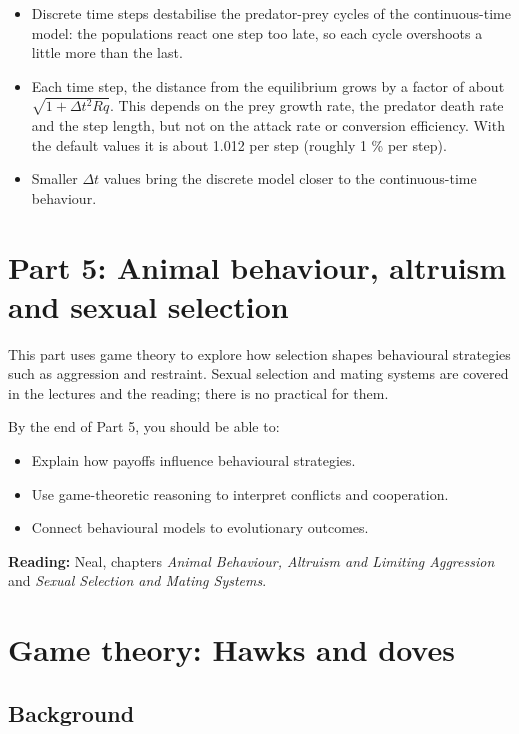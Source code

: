 \documentclass[
  a4paper]{book}
\providecommand{\tightlist}{%
  \setlength{\itemsep}{0pt}\setlength{\parskip}{0pt}}
\begin{document}
\begin{itemize}
\tightlist
\item
  Discrete time steps destabilise the predator-prey cycles of the continuous-time model: the populations react one step too late, so each cycle overshoots a little more than the last.
\item
  Each time step, the distance from the equilibrium grows by a factor of about \(\sqrt{1 + \Delta t^2 R q}\). This depends on the prey growth rate, the predator death rate and the step length, but not on the attack rate or conversion efficiency. With the default values it is about 1.012 per step (roughly 1 \% per step).
\item
  Smaller \(\Delta t\) values bring the discrete model closer to the continuous-time behaviour.
\end{itemize}

\chapter*{Part 5: Animal behaviour, altruism and sexual selection}\label{part-5}

This part uses game theory to explore how selection shapes behavioural strategies such as aggression and restraint. Sexual selection and mating systems are covered in the lectures and the reading; there is no practical for them.

By the end of Part 5, you should be able to:

\begin{itemize}
\tightlist
\item
  Explain how payoffs influence behavioural strategies.
\item
  Use game-theoretic reasoning to interpret conflicts and cooperation.
\item
  Connect behavioural models to evolutionary outcomes.
\end{itemize}

\textbf{Reading:} Neal, chapters \emph{Animal Behaviour, Altruism and Limiting Aggression} and \emph{Sexual Selection and Mating Systems}.

\chapter{Game theory: Hawks and doves}\label{game-theory-hawks-and-doves}

\section{Background}\label{background-19}
\end{document}
